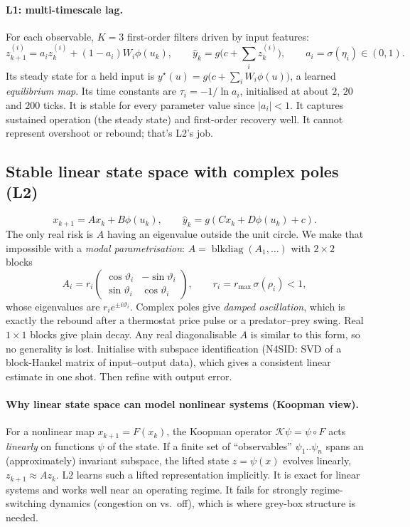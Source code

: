 \documentclass[11pt]{article}
\theoremstyle{plain}
\theoremstyle{definition}
\theoremstyle{remark}
\newcommand{\abs}[1]{\left\lvert #1 \right\rvert}
\begin{document}
\paragraph{L1: multi-timescale lag.} For each observable, $K=3$ first-order filters driven by input features:
\begin{equation}
z^{(i)}_{k+1}=a_i z^{(i)}_k+(1-a_i)W_i\phi(u_k),\qquad \hat y_k=g\Big(c+\sum_i z^{(i)}_k\Big),\qquad a_i=\sigma(\eta_i)\in(0,1).
\end{equation}
Its steady state for a held input is $y^\star(u)=g\big(c+\sum_iW_i\phi(u)\big)$, a learned \emph{equilibrium map}. Its time constants are $\tau_i=-1/\ln a_i$, initialised at about $2$, $20$ and $200$ ticks. It is stable for every parameter value since $\abs{a_i}<1$. It captures sustained operation (the steady state) and first-order recovery well. It cannot represent overshoot or rebound; that's L2's job.

\subsection{Stable linear state space with complex poles (L2)}
\begin{equation}
x_{k+1}=Ax_k+B\phi(u_k),\qquad \hat y_k=g(Cx_k+D\phi(u_k)+c).
\end{equation}
The only real risk is $A$ having an eigenvalue outside the unit circle. We make that impossible with a \emph{modal parametrisation}: $A=\operatorname{blkdiag}(A_1,\dots)$ with $2\times2$ blocks
\begin{equation}
A_i=r_i\begin{pmatrix}\cos\vartheta_i&-\sin\vartheta_i\\ \sin\vartheta_i&\cos\vartheta_i\end{pmatrix},\qquad r_i=r_{\max}\,\sigma(\rho_i)<1,
\end{equation}
whose eigenvalues are $r_ie^{\pm i\vartheta_i}$. Complex poles give \emph{damped oscillation}, which is exactly the rebound after a thermostat price pulse or a predator--prey swing. Real $1\times1$ blocks give plain decay. Any real diagonalisable $A$ is similar to this form, so no generality is lost. Initialise with subspace identification (N4SID: SVD of a block-Hankel matrix of input--output data), which gives a consistent linear estimate in one shot. Then refine with output error.

\paragraph{Why linear state space can model nonlinear systems (Koopman view).} For a nonlinear map $x_{k+1}=F(x_k)$, the Koopman operator $\mathcal K\psi=\psi\circ F$ acts \emph{linearly} on functions $\psi$ of the state. If a finite set of ``observables'' $\psi_1..\psi_n$ spans an (approximately) invariant subspace, the lifted state $z=\psi(x)$ evolves linearly, $z_{k+1}\approx Az_k$. L2 learns such a lifted representation implicitly. It is exact for linear systems and works well near an operating regime. It fails for strongly regime-switching dynamics (congestion on vs.\ off), which is where grey-box structure is needed.
\end{document}
